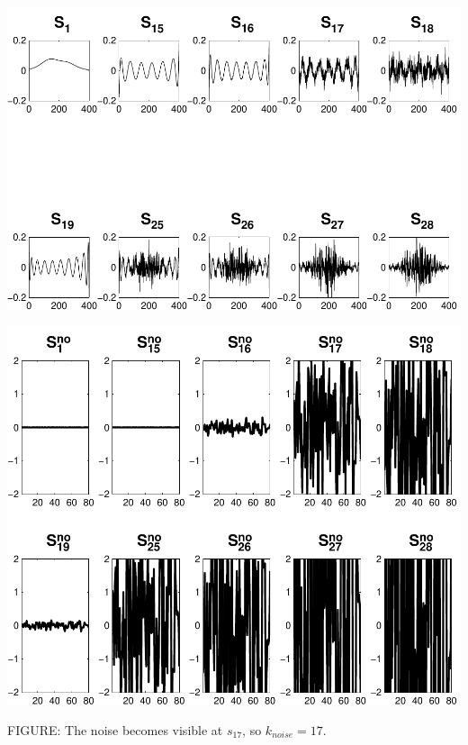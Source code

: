 \documentclass[11pt]{amsart}
\begin{document}
	\vspace{5mm}
	\begin{minipage}[t]{0.5\textwidth}
	
		\includegraphics[width=.95\linewidth]{figures/run1/sk_plots} 
   
	\end{minipage}
	\begin{minipage}[t]{0.5\textwidth}
	
		\includegraphics[width=.75\linewidth]{figures/run1/noise_parts} 
   
	\end{minipage}
	\begin{center}
		FIGURE: 
		The noise becomes visible at $s_17$, so $k_{noise} = 17$.
	\end{center} 
	\vspace{5mm}

	
	
\end{document}
